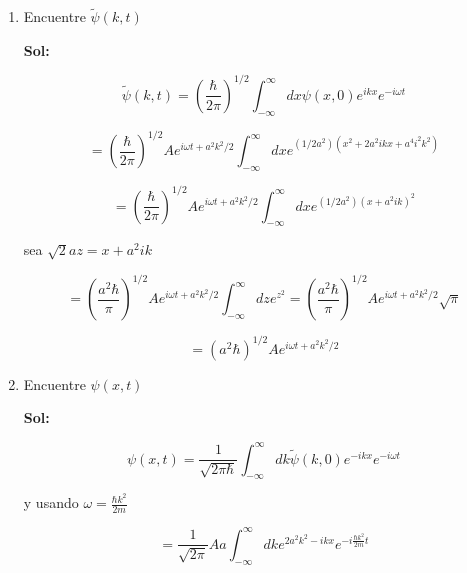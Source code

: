 \documentclass[12pt,a4paper]{article}
\begin{document}
\begin{enumerate}
\begin{enumerate}
        
        \item Encuentre $\tilde{\psi}(k,t)$
        
        \textbf{Sol:}
        
        \begin{equation*}
            \tilde{\psi}(k,t) = \left(\frac{\hbar}{2\pi}\right)^{1/2} \int_{-\infty}^{\infty} dx \psi (x,0) e^{ikx} e^{-i\omega t}
        \end{equation*}
        
         
         \begin{equation*}
             = \left(\frac{\hbar}{2\pi}\right)^{1/2}Ae^{i \omega t+ a^2k^2/2} \int_{-\infty}^{\infty} dx  e^{(1/2a^2)(x^2 +2a^2ikx+a^4i^2k^2)}
         \end{equation*}
         
         \begin{equation*}
             = \left(\frac{\hbar}{2\pi}\right)^{1/2}Ae^{i \omega t+ a^2k^2/2} \int_{-\infty}^{\infty} dx  e^{(1/2a^2)(x+ a^2 i k)^2}
         \end{equation*}
         
         sea $\sqrt{2}az =  x+ a^2ik$
         
         \begin{equation*}
             = \left(\frac{a^2\hbar}{\pi}\right)^{1/2}Ae^{i \omega t+ a^2k^2/2} \int_{-\infty}^{\infty} dz  e^{z^2} = \left(\frac{a^2\hbar}{\pi}\right)^{1/2}Ae^{i \omega t+ a^2k^2/2} \sqrt{\pi} 
         \end{equation*}
         
         \begin{equation*}
             = \left(a^2\hbar\right)^{1/2}Ae^{i \omega t+ a^2k^2/2} 
         \end{equation*}
                 
        
        
        \item Encuentre $\psi(x,t)$
        
        \textbf{Sol:}
        
        \begin{equation*}
            \psi(x,t) = \frac{1}{\sqrt{2\pi \hbar}} \int_{-\infty}^{\infty} dk \tilde{\psi}(k,0) e^{-ikx} e^{-i \omega t}
        \end{equation*}
        
        y usando $ \omega = \frac{\hbar k^2}{2m}$
        
        \begin{equation*}
            = \frac{1}{\sqrt{2\pi}} Aa  \int_{-\infty}^{\infty} dk e^{2a^2k^2 - ikx} e^{-i \frac{\hbar k^2}{2m}t}
        \end{equation*}
        

\end{enumerate}
\end{enumerate}
\end{document}

